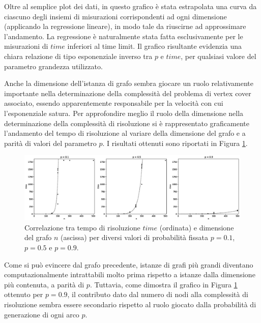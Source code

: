 Oltre al semplice plot dei dati, in questo grafico è stata estrapolata una curva da ciascuno degli insiemi di misurazioni corrispondenti ad ogni dimensione (applicando la regressione lineare), in modo tale da riuscirne ad approssimare l'andamento. La regressione è naturalmente stata fatta esclusivamente per le misurazioni di $time$ inferiori al time limit. Il grafico risultante evidenzia una chiara relazione di tipo esponenziale inverso tra $p$ e $time$, per qualsiasi valore del parametro grandezza utilizzato. 

Anche la dimensione dell'istanza di grafo sembra giocare un ruolo relativamente importante nella determinazione della complessità del problema di vertex cover associato, essendo apparentemente responsabile per la velocità con cui l'esponenziale satura.
Per approfondire meglio il ruolo della dimensione nella determinazione della complessità di risoluzione si è rappresentato graficamente l'andamento del tempo di risoluzione al variare della dimensione del grafo e a parità di valori del parametro $p$. I risultati ottenuti sono riportati in Figura \ref{fig:gnpp}.

\begin{figure}[h!]
     \centering
       \includegraphics[scale=0.4]{images/gnp_p.eps}
       \caption{Correlazione tra tempo di risoluzione $time$ (ordinata) e dimensione del grafo $n$ (ascissa) per diversi valori di probabilità fissata $p=0.1$, $p=0.5$ e $p=0.9$.}
        \label{fig:gnpp}
\end{figure}

Come si può evincere dal grafo precedente, istanze di grafi più grandi diventano computazionalmente intrattabili molto prima rispetto a istanze dalla dimensione più contenuta, a parità di $p$. Tuttavia, come dimostra il grafico in Figura \ref{fig:gnpp} ottenuto per $p=0.9$,  il contributo dato dal numero di nodi alla complessità di risoluzione sembra essere secondario rispetto al ruolo giocato dalla probabilità di generazione di ogni arco $p$. 


